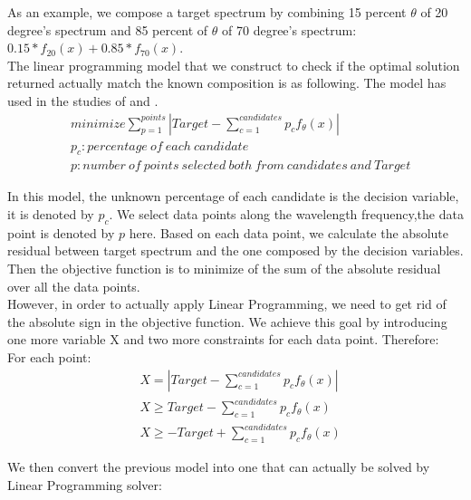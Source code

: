 As an example, we compose a target spectrum by combining 15 percent $\theta$ of 20 degree's spectrum and 85 percent of $\theta$ of 70 degree's spectrum: $0.15*f_{20}(x) + 0.85*f_{70}(x)$. \\


The linear programming model that we construct to check if the optimal solution returned actually match the known composition is as following. The model has used in the studies of \cite{03}  and \cite{04}. \\
\begin{eqnarray}
& minimize \displaystyle\sum^{points}_{p=1} \left| Target- \displaystyle\sum^{candidates}_{c=1}p_{c}f_{\theta}(x) \right| \nonumber \\
& p_c: percentage ~of~ each~ candidate \nonumber \\
& p: number~ of~ points~ selected~ both~ from~ candidates~ and~ Target \nonumber 
\end{eqnarray}
 
In this model, the unknown percentage of each candidate is the decision variable, it is denoted by $p_c$. We select data points along the wavelength frequency,the data point is denoted by $p$ here. Based on each data point, we calculate the absolute residual between target spectrum and the one composed by the decision variables. Then the objective function is to minimize of the sum of the absolute residual over all the data points. \\

However, in order to actually apply Linear Programming, we need to get rid of the absolute sign in the objective function. We achieve this goal by introducing one more variable X and two more constraints for each data point. Therefore:\\

For each point:
\begin{eqnarray} 
& X = \left| Target-\displaystyle\sum^{candidates}_{c=1}p_{c}f_{\theta}(x) \right| \nonumber \\
&  X \geq Target-\displaystyle\sum^{candidates}_{c=1}p_{c}f_{\theta}(x)   \nonumber \\
& X \geq -Target+\displaystyle\sum^{candidates}_{c=1}p_{c}f_{\theta}(x)  \nonumber
\end{eqnarray} 

We then convert the previous model into one that can actually be solved by Linear Programming solver:\\

